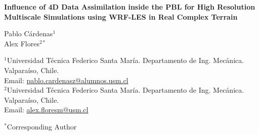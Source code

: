 \bce
\large{\textbf{Influence of 4D Data Assimilation inside the PBL for High Resolution Multiscale Simulations using WRF-LES in Real Complex Terrain}}\\
\ece

Pablo Cárdenas$^1$\\
Alex Flores$^{2*}$

\bigskip
$^1$Universidad Técnica Federico Santa María. Departamento de Ing. Mecánica. Valparaíso, Chile.\\
Email: \href{mailto:pablo.cardenasz@alumnos.usm.cl}{pablo.cardenasz@alumnos.usm.cl}\\
$^2$Universidad Técnica Federico Santa María. Departamento de Ing. Mecánica. Valparaíso, Chile.\\
Email: \href{mailto:alex.floresm@usm.cl}{alex.floresm@usm.cl}

$^*$Corresponding Author

\bigskip

